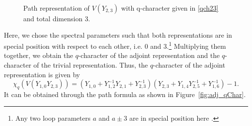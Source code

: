 \documentclass[12pt,reqno]{amsart}
\newcommand{\RF}[1]{(*{{\color{red}RF:  {#1}}}*)}
\newcommand{\HJ}[1]{(*{{\color{red}HJ:  {#1}}}*)}
\numberwithin{equation}{section}
\begin{document}
\begin{figure}[htbp]
	
	\caption{Path representation of $V(Y_{2,3})$ with q-character given in \eqref{qch23} and total dimension $3$.}
	\label{fig:antifund_qChar}
	
\end{figure}
Here, we chose the spectral parameters such that both representations are in special position with respect to each other, i.e. $0$ and $3$.\footnote{ Any two loop parameters $a$ and $a\pm 3$ are in special position here \cite{C2002}.} Multiplying them together, we obtain the $q$-character of the adjoint representation and the $q$-character of the trivial representation. Thus, the $q$-character of the adjoint representation is given by
\begin{equation}\label{qchar8}
	\chi_q(V(Y_{1,0}Y_{2,3})) =(Y_{1,0}+Y_{1,2}^{-1}Y_{2,1}+Y_{2,3}^{-1})(Y_{2,3}+Y_{1,4}Y_{2,5}^{-1}+Y_{1,6}^{-1})-1.
\end{equation}
It can be obtained through the path formula as shown in Figure~\ref{fig:adj_qChar}.
\end{document}
